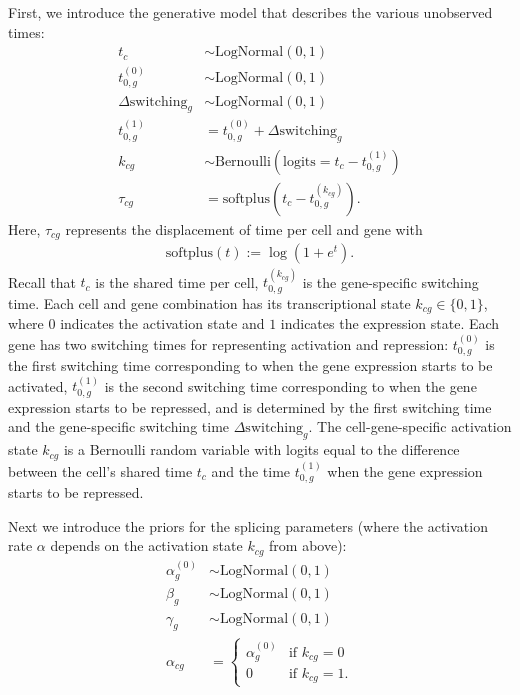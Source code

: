 \documentclass[
  sn-mathphys-num,
  lineno,
  twocolumn]{sn-jnl}
\begin{document}
First, we introduce the generative model that describes the various
unobserved times: \begin{align}
  t_c &\sim \text{LogNormal}(0, 1) \\
  t^{(0)}_{0,g} &\sim \text{LogNormal}(0, 1) \\
  \Delta \textrm{switching}_g &\sim \text{LogNormal}(0, 1) \\
  t^{(1)}_{0,g} &= t^{(0)}_{0,g} + \Delta \textrm{switching}_g \\
  k_{cg} &\sim \text{Bernoulli}(\textrm{logits}=t_c - t^{(1)}_{0,g}) \\
  \tau_{cg} &= \text{softplus}(t_c - t^{(k_{cg})}_{0,g}).
\end{align} Here, \(\tau_{cg}\) represents the displacement of time per
cell and gene with \begin{align}
 \text{softplus}(t) :=  \log( 1 + e^t).
\end{align} Recall that \(t_c\) is the shared time per cell,
\(t^{(k_{cg})}_{0,g}\) is the gene-specific switching time. Each cell
and gene combination has its transcriptional state
\(k_{cg} \in \{ 0, 1 \}\), where \(0\) indicates the activation state
and \(1\) indicates the expression state. Each gene has two switching
times for representing activation and repression: \(t^{(0)}_{0,g}\) is
the first switching time corresponding to when the gene expression
starts to be activated, \(t^{(1)}_{0,g}\) is the second switching time
corresponding to when the gene expression starts to be repressed, and is
determined by the first switching time and the gene-specific switching
time \(\Delta \text{switching}_g\). The cell-gene-specific activation
state \(k_{cg}\) is a Bernoulli random variable with logits equal to the
difference between the cell's shared time \(t_c\) and the time
\(t^{(1)}_{0,g}\) when the gene expression starts to be repressed.

Next we introduce the priors for the splicing parameters (where the
activation rate \(\alpha\) depends on the activation state \(k_{cg}\)
from above): \begin{align}
  \alpha^{(0)}_g &\sim \text{LogNormal}(0, 1) \\
  \beta_g &\sim \text{LogNormal}(0, 1) \\
  \gamma_g &\sim \text{LogNormal}(0, 1) \\
  \alpha_{cg} &= \begin{cases}
    \alpha^{(0)}_g & \text{if } k_{cg} = 0 \\
    0 & \text{if } k_{cg} = 1.
  \end{cases}
\end{align}
\end{document}
